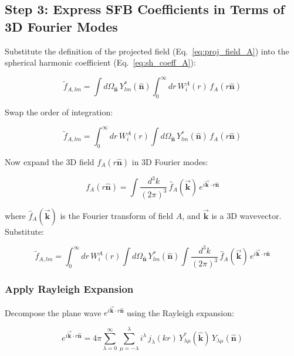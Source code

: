 \subsection{Step 3: Express SFB Coefficients in Terms of 3D Fourier Modes}

Substitute the definition of the projected field (Eq.~\ref{eq:proj_field_A}) into the spherical harmonic coefficient (Eq.~\ref{eq:sh_coeff_A}):

\begin{equation}
    \tilde{f}_{A,lm} = \int d\Omega_{\hat{\mathbf{n}}} \, Y_{lm}^*(\hat{\mathbf{n}}) \int_0^{\infty} dr \, W_i^A(r) \, f_A(r\hat{\mathbf{n}})
\label{eq:sh_coeff_A_expanded}
\end{equation}

Swap the order of integration:

\begin{equation}
    \tilde{f}_{A,lm} = \int_0^{\infty} dr \, W_i^A(r) \int d\Omega_{\hat{\mathbf{n}}} \, Y_{lm}^*(\hat{\mathbf{n}}) \, f_A(r\hat{\mathbf{n}})
\label{eq:sh_coeff_A_reordered}
\end{equation}

Now expand the 3D field $f_A(r\hat{\mathbf{n}})$ in 3D Fourier modes:

\begin{equation}
    f_A(r\hat{\mathbf{n}}) = \int \frac{d^3k}{(2\pi)^3} \, \hat{f}_A(\vec{\mathbf{k}}) \, e^{i\vec{\mathbf{k}} \cdot r\hat{\mathbf{n}}}
\label{eq:fourier_decomp_A}
\end{equation}

where $\hat{f}_A(\vec{\mathbf{k}})$ is the Fourier transform of field $A$, and $\vec{\mathbf{k}}$ is a 3D wavevector. Substitute:

\begin{equation}
    \tilde{f}_{A,lm} = \int_0^{\infty} dr \, W_i^A(r) \int d\Omega_{\hat{\mathbf{n}}} \, Y_{lm}^*(\hat{\mathbf{n}}) \int \frac{d^3k}{(2\pi)^3} \, \hat{f}_A(\vec{\mathbf{k}}) \, e^{i\vec{\mathbf{k}} \cdot r\hat{\mathbf{n}}}
\label{eq:sh_coeff_A_fourier}
\end{equation}

\subsubsection{Apply Rayleigh Expansion}

Decompose the plane wave $e^{i\vec{\mathbf{k}} \cdot r\hat{\mathbf{n}}}$ using the Rayleigh expansion:

\begin{equation}
    e^{i\vec{\mathbf{k}} \cdot r\hat{\mathbf{n}}} = 4\pi \sum_{\lambda=0}^{\infty} \sum_{\mu=-\lambda}^{\lambda} i^{\lambda} \, j_{\lambda}(kr) \, Y_{\lambda\mu}^*(\hat{\mathbf{k}}) \, Y_{\lambda\mu}(\hat{\mathbf{n}})
\label{eq:rayleigh}
\end{equation}

